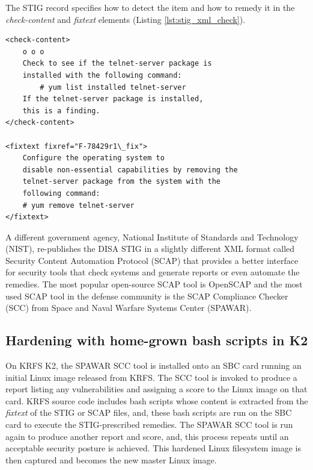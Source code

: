 \documentclass[12pt]{article}
\begin{document}
The STIG record specifies how to detect the item and how to remedy it in the
\emph{check-content} and \emph{fixtext} elements (Listing
\ref{lst:stig_xml_check}).

\lstset{
    language=xml,
    basicstyle=\footnotesize\ttfamily,
    linewidth=5.0in,
    frame=single,
    showstringspaces=false
}
\begin{adjustwidth}{0.5in}{0.0in}
\begin{minipage}{\linewidth}
\begin{lstlisting}[caption={STIG record \emph{check-content} and \emph{fixtext}},
label={lst:stig_xml_check}]
<check-content>
    o o o
    Check to see if the telnet-server package is
    installed with the following command:
        # yum list installed telnet-server
    If the telnet-server package is installed,
    this is a finding.
</check-content>

<fixtext fixref="F-78429r1\_fix">
    Configure the operating system to
    disable non-essential capabilities by removing the
    telnet-server package from the system with the
    following command:
    # yum remove telnet-server
</fixtext>
\end{lstlisting}
\end{minipage}
\end{adjustwidth}
\vspace{0.8cm}

A different government agency, National Institute of Standards and Technology
(NIST), re-publishes the DISA STIG in a slightly different XML format called
Security Content Automation Protocol (SCAP) that provides a better interface for
security tools that check systems and generate reports or even automate the
remedies.  The most popular open-source SCAP tool is OpenSCAP and the most used
SCAP tool in the defense community is the SCAP Compliance Checker (SCC) from
Space and Naval Warfare Systems Center (SPAWAR).

\subsection{Hardening with home-grown bash scripts in K2}
On KRFS K2, the SPAWAR SCC tool is installed onto an SBC card running an initial
Linux image released from KRFS.  The SCC tool is invoked to produce a report
listing any vulnerabilities and assigning a score to the Linux image on that
card.  KRFS source code includes bash scripts whose content is extracted from
the \emph{fixtext} of the STIG or SCAP files, and, these bash scripts are run on
the SBC card to execute the STIG-prescribed remedies.  The SPAWAR SCC tool is
run again to produce another report and score, and, this process repeats until
an acceptable security posture is achieved.  This hardened Linux filesystem
image is then captured and becomes the new master Linux image.
\end{document}
